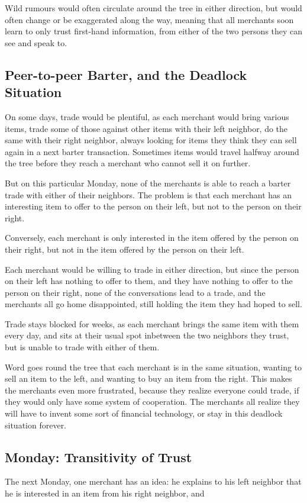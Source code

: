 \documentclass[11pt,twoside,a4paper]{article}
\begin{document}
Wild rumours would often circulate around the tree in either direction, but would often change or be exaggerated along the way, meaning that all merchants soon learn to only trust first-hand information, from either of the two persons they can see and speak to.

\subsection{Peer-to-peer Barter, and the Deadlock Situation}
On some days, trade would be plentiful, as each merchant would bring various items, trade some of those against other items with their left neighbor, do the same with their right neighbor, always looking for items they think they can sell again in a next barter transaction. Sometimes items would travel halfway around the tree before they reach a merchant who cannot sell it on further.

But on this particular Monday, none of the merchants is able to reach a barter trade with either of their neighbors. The problem is that each merchant has an interesting item to offer to the person on their left, but not to the person on their right.

Conversely, each merchant is only interested in the item offered by the person on their right, but not in the item offered by the person on their left.

Each merchant would be willing to trade in either direction, but since the person on their left has nothing to offer to them, and they have nothing to offer to the person on their right, none of the conversations lead to a trade, and the merchants all go home disappointed, still holding the item they had hoped to sell.

Trade stays blocked for weeks, as each merchant brings the same item with them every day, and sits at their usual spot inbetween the two neighbors they trust, but is unable to trade with either of them.

Word goes round the tree that each merchant is in the same situation, wanting to sell an item to the left, and wanting to buy an item from the right. This makes the merchants even more frustrated, because they realize everyone could trade, if they would only have some system of cooperation. The merchants all realize they will have to invent some sort of financial technology, or stay in this deadlock situation forever.

\subsection{Monday: Transitivity of Trust}
The next Monday, one merchant has an idea: he explains to his left neighbor that he is interested in an item from his right neighbor, and 
\end{document}
